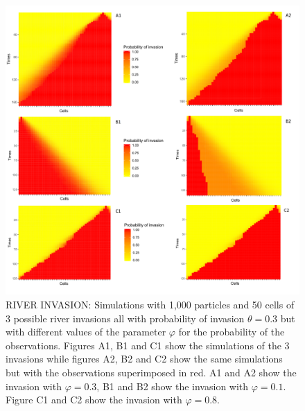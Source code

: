 \begin{figure}
    \includegraphics[width=\textwidth]{river_007.png}
    \caption{RIVER INVASION: Simulations with 1,000 particles and 50 cells of 3 possible river invasions all with probability of invasion $\theta = 0.3$ but with different values of the parameter $\varphi$ for the probability of the observations. Figures A1, B1 and C1 show the simulations of the 3 invasions while figures A2, B2 and C2 show the same simulations but with the observations superimposed in red. A1 and A2 show the invasion with $\varphi = 0.3$, B1 and B2 show the invasion with $\varphi = 0.1$. Figure C1 and C2 show the invasion with $\varphi = 0.8$.}
    \label{fig:2}
\end{figure}








